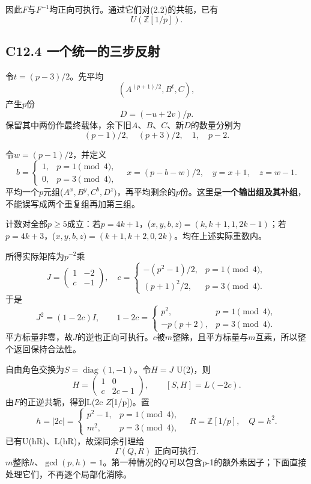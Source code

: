\documentclass[11pt,a4paper]{article}
\theoremstyle{definition}
\numberwithin{equation}{section}
\begin{document}
{因此\ensuremath{F}与\ensuremath{F^{-1}}均正向可执行。通过它们对(2.2)的共轭，已有} \[
\boxed{U(\mathbb Z[1/p]).}
\tag{C12.3.3}
\]

\subsection*{\texorpdfstring{{C12.4} {一个统一的三步反射}}{C12.4 一个统一的三步反射}}\label{C12-h86}

{令\ensuremath{t=(p-3)/2}。先平均} \[
(A^{(p+1)/2},B^t,C),
\] {产生\ensuremath{p}份} \[
D=(-u+2v)/p.
\] {保留其中两份作最终载体，余下旧\ensuremath{A}、\ensuremath{B}、\ensuremath{C}、新\ensuremath{D}的数量分别为} \[
(p-1)/2,\quad(p+3)/2,\quad1,\quad p-2.
\]

{令\ensuremath{w=(p-1)/2}，并定义} \[
b=\begin{cases}1,&p=1\pmod4,\\0,&p=3\pmod4,\end{cases}
\quad
x=(p-b-w)/2,\quad y=x+1,\quad z=w-1.
\] {平均一个\ensuremath{p}元组(\ensuremath{A^{x},B^{y},C^{b},D^{z})}，再平均剩余的\ensuremath{p}份。这里是}\textbf{{一个输出组及其补组}}{，不能误写成两个重复组再加第三组。}

{计数对全部\ensuremath{p\ge 5}成立：若\ensuremath{p=4k+1}，(\ensuremath{x,y,b,z)=(k,k+1,1,2k-1)}；若\ensuremath{p=4k+3}，(\ensuremath{x,y,b,z)=(k+1,k+2,0,2k)}。均在上述实际重数内。}

{所得实际矩阵为\ensuremath{p^{-2}}乘} \[
J=\begin{pmatrix}1&-2\\c&-1\end{pmatrix},
\quad
c=\begin{cases}
-(p^2-1)/2,&p=1\pmod4,\\
(p+1)^2/2,&p=3\pmod4.
\end{cases}
\tag{C12.4.1}
\] {于是} \[
J^2=(1-2c)I,\qquad
1-2c=
\begin{cases}p^2,&p=1\pmod4,\\-p(p+2),&p=3\pmod4.\end{cases}
\] {平方标量非零，故\ensuremath{J}的逆也正向可执行。\ensuremath{c}被\ensuremath{m}整除，且平方标量与\ensuremath{m}互素，所以整个返回保持合法性。}

{自由角色交换为\ensuremath{S=\operatorname{diag}(1,-1)}。令\ensuremath{H=J}} {U(2)，则} \[
H=\begin{pmatrix}1&0\\c&2c-1\end{pmatrix},
\qquad
\boxed{[S,H]=L(-2c).}
\tag{C12.4.2}
\] {由\ensuremath{F}的正逆共轭，得到L(2c} {\ensuremath{Z}{[}1/p{]})。置} \[
h=|2c|=
\begin{cases}p^2-1,&p=1\pmod4,\\m^2,&p=3\pmod4,\end{cases}
\quad R=\mathbb Z[1/p],\quad Q=h^2.
\tag{C12.4.3}
\] {已有U(hR)、L(hR)，故深同余引理给} \[
\boxed{\Gamma(Q,R)\text{ 正向可执行}.}
\tag{C12.4.4}
\] {\ensuremath{m}整除\ensuremath{h}、\ensuremath{\operatorname{gcd}(p,h)=1}。第一种情况的\ensuremath{Q}可以包含p-1的额外素因子；下面直接处理它们，不再逐个局部化消除。}
\end{document}
